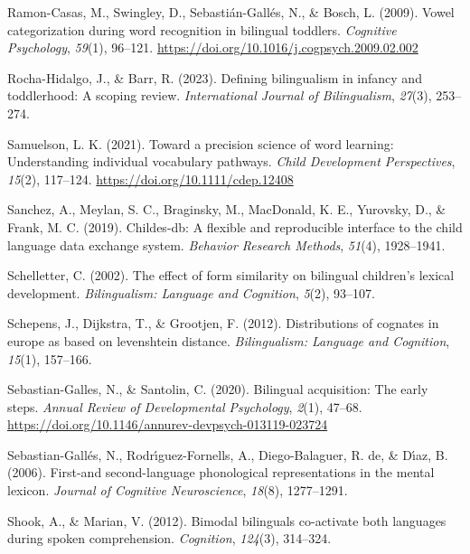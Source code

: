 \documentclass[
]{article}
\newlength{\cslhangindent}
\newlength{\cslentryspacingunit} %
\newenvironment{CSLReferences}[2] %
 {%
  \setlength{\parindent}{0pt}
  \ifodd #1
  \let\oldpar\par
  \def\par{\hangindent=\cslhangindent\oldpar}
  \fi
  \setlength{\parskip}{#2\cslentryspacingunit}
 }%
 {}
\begin{document}
\begin{CSLReferences}{1}{0}
\leavevmode{}%
Ramon-Casas, M., Swingley, D., Sebastián-Gallés, N., \& Bosch, L.
(2009). Vowel categorization during word recognition in bilingual
toddlers. \emph{Cognitive Psychology}, \emph{59}(1), 96--121.
\url{https://doi.org/10.1016/j.cogpsych.2009.02.002}

\leavevmode{}%
Rocha-Hidalgo, J., \& Barr, R. (2023). Defining bilingualism in infancy
and toddlerhood: A scoping review. \emph{International Journal of
Bilingualism}, \emph{27}(3), 253--274.

\leavevmode{}%
Samuelson, L. K. (2021). Toward a precision science of word learning:
Understanding individual vocabulary pathways. \emph{Child Development
Perspectives}, \emph{15}(2), 117--124.
\url{https://doi.org/10.1111/cdep.12408}

\leavevmode{}%
Sanchez, A., Meylan, S. C., Braginsky, M., MacDonald, K. E., Yurovsky,
D., \& Frank, M. C. (2019). Childes-db: A flexible and reproducible
interface to the child language data exchange system. \emph{Behavior
Research Methods}, \emph{51}(4), 1928--1941.

\leavevmode{}%
Schelletter, C. (2002). The effect of form similarity on bilingual
children's lexical development. \emph{Bilingualism: Language and
Cognition}, \emph{5}(2), 93--107.

\leavevmode{}%
Schepens, J., Dijkstra, T., \& Grootjen, F. (2012). Distributions of
cognates in europe as based on levenshtein distance. \emph{Bilingualism:
Language and Cognition}, \emph{15}(1), 157--166.

\leavevmode{}%
Sebastian-Galles, N., \& Santolin, C. (2020). Bilingual acquisition: The
early steps. \emph{Annual Review of Developmental Psychology},
\emph{2}(1), 47--68.
\url{https://doi.org/10.1146/annurev-devpsych-013119-023724}

\leavevmode{}%
Sebastian-Gallés, N., Rodrı́guez-Fornells, A., Diego-Balaguer, R. de, \&
Dı́az, B. (2006). First-and second-language phonological representations
in the mental lexicon. \emph{Journal of Cognitive Neuroscience},
\emph{18}(8), 1277--1291.

\leavevmode{}%
Shook, A., \& Marian, V. (2012). Bimodal bilinguals co-activate both
languages during spoken comprehension. \emph{Cognition}, \emph{124}(3),
314--324.


\end{CSLReferences}
\end{document}
